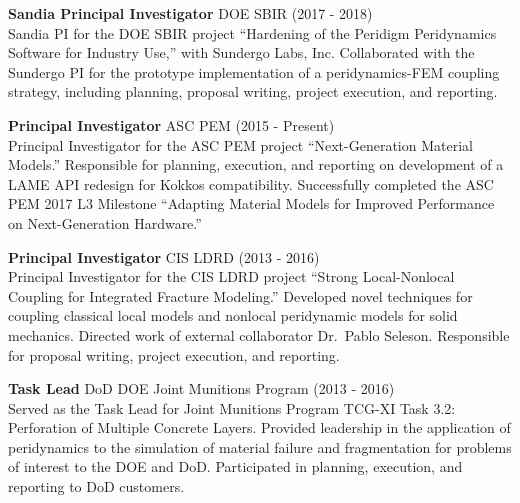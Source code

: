 \begin{minipage}{\minipagewidth}
\textbf{Sandia Principal Investigator} DOE SBIR (2017 - 2018) \\
%
Sandia PI for the DOE SBIR project ``Hardening of the Peridigm Peridynamics Software for Industry Use,'' with Sundergo Labs, Inc.  Collaborated with the Sundergo PI for the prototype implementation of a peridynamics-FEM coupling strategy, including planning, proposal writing, project execution, and reporting.
\end{minipage}\vspace{\parskip}

\begin{minipage}{\minipagewidth}
\textbf{Principal Investigator} ASC PEM (2015 - Present) \\
%
Principal Investigator for the ASC PEM project ``Next-Generation Material Models.''  Responsible for planning, execution, and reporting on development of a LAME API redesign for Kokkos compatibility.  Successfully completed the ASC PEM 2017 L3 Milestone ``Adapting Material Models for Improved Performance on Next-Generation Hardware.''
\end{minipage}\vspace{\parskip}

\begin{minipage}{\minipagewidth}
\textbf{Principal Investigator} CIS LDRD (2013 - 2016) \\
%
Principal Investigator for the CIS LDRD project ``Strong Local-Nonlocal Coupling for Integrated Fracture Modeling.''  Developed novel techniques for coupling classical local models and nonlocal peridynamic models for solid mechanics.  Directed work of external collaborator Dr.~Pablo Seleson.  Responsible for proposal writing, project execution, and reporting.
\end{minipage}\vspace{\parskip}

\begin{minipage}{\minipagewidth}
\textbf{Task Lead} DoD DOE Joint Munitions Program (2013 - 2016) \\
%
Served as the Task Lead for Joint Munitions Program TCG-XI Task 3.2:  Perforation of Multiple Concrete Layers.  Provided leadership in the application of peridynamics to the simulation of material failure and fragmentation for problems of interest to the DOE and DoD.  Participated in planning, execution, and reporting to DoD customers.
\end{minipage}\vspace{\parskip}

